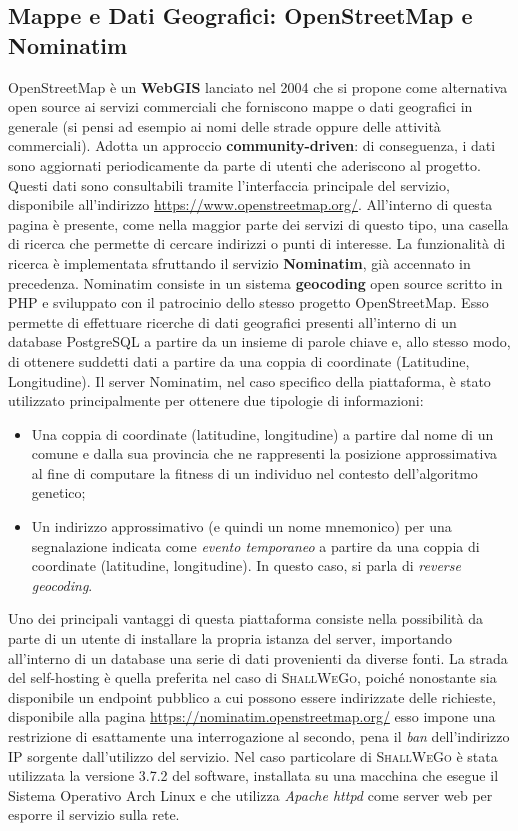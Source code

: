     \subsection{Mappe e Dati Geografici: OpenStreetMap e Nominatim}
        OpenStreetMap è un \textbf{WebGIS} lanciato nel 2004 che si propone come alternativa open source ai servizi commerciali che forniscono mappe o dati geografici in generale (si pensi ad esempio ai nomi delle strade oppure delle attività commerciali). Adotta un approccio \textbf{community-driven}: di conseguenza, i dati sono aggiornati periodicamente da parte di utenti che aderiscono al progetto. Questi dati sono consultabili tramite l'interfaccia principale del servizio, disponibile all'indirizzo \url{https://www.openstreetmap.org/}. All'interno di questa pagina è presente, come nella maggior parte dei servizi di questo tipo, una casella di ricerca che permette di cercare indirizzi o punti di interesse. La funzionalità di ricerca è implementata sfruttando il servizio \textbf{Nominatim}, già accennato in precedenza.
        Nominatim consiste in un sistema \textbf{geocoding} open source scritto in PHP e sviluppato con il patrocinio dello stesso progetto OpenStreetMap. Esso permette di effettuare ricerche di dati geografici presenti all'interno di un database PostgreSQL a partire da un insieme di parole chiave e, allo stesso modo, di ottenere suddetti dati a partire da una coppia di coordinate (Latitudine, Longitudine).
        Il server Nominatim, nel caso specifico della piattaforma, è stato utilizzato principalmente per ottenere due tipologie di informazioni:
        \begin{itemize}
            \item Una coppia di coordinate (latitudine, longitudine) a partire dal nome di un comune e dalla sua provincia che ne rappresenti la posizione approssimativa al fine di computare la fitness di un individuo nel contesto dell'algoritmo genetico;
            \item Un indirizzo approssimativo (e quindi un nome mnemonico) per una segnalazione indicata come \textit{evento temporaneo} a partire da una coppia di coordinate (latitudine, longitudine). In questo caso, si parla di \textit{reverse geocoding}.
        \end{itemize}
        Uno dei principali vantaggi di questa piattaforma consiste nella possibilità da parte di un utente di installare la propria istanza del server, importando all'interno di un database una serie di dati provenienti da diverse fonti. 
        La strada del self-hosting è quella preferita nel caso di \textsc{ShallWeGo}, poiché nonostante sia disponibile un endpoint pubblico a cui possono essere indirizzate delle richieste, disponibile alla pagina \url{https://nominatim.openstreetmap.org/} esso impone una restrizione di esattamente una interrogazione al secondo, pena il \textit{ban} dell'indirizzo IP sorgente dall'utilizzo del servizio. 
        Nel caso particolare di \textsc{ShallWeGo} è stata utilizzata la versione 3.7.2 del software, installata su una macchina che esegue il Sistema Operativo Arch Linux e che utilizza \textit{Apache httpd} come server web per esporre il servizio sulla rete.

